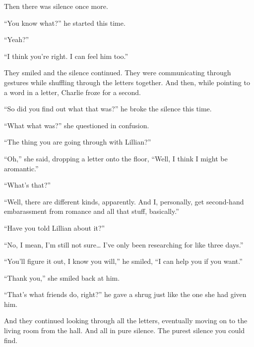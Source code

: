 Then there was silence once more.

“You know what?” he started this time.

“Yeah?”

“I think you're right. I can feel him too.”

They smiled and the silence continued. They were communicating through gestures while shuffling through the letters together. And then, while pointing to a word in a letter, Charlie froze for a second.

“So did you find out what that was?” he broke the silence this time.

“What what was?” she questioned in confusion.

“The thing you are going through with Lillian?”

“Oh,” she said, dropping a letter onto the floor, “Well, I think I might be aromantic.”

“What's that?”

“Well, there are different kinds, apparently. And I, personally, get second-hand embarassment from romance and all that stuff, basically.”

“Have you told Lillian about it?”

“No, I mean, I'm still not sure… I've only been researching for like three days.”

“You'll figure it out, I know you will,” he smiled, “I can help you if you want.”

“Thank you,” she smiled back at him.

“That's what friends do, right?” he gave a shrug just like the one she had given him.

And they continued looking through all the letters, eventually moving on to the living room from the hall. And all in pure silence. The purest silence you could find.